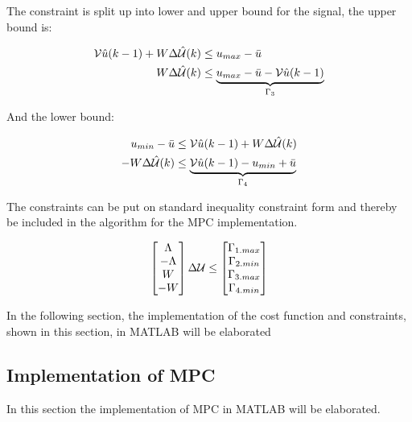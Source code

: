 The constraint is split up into lower and upper bound for the signal, the upper bound is:

 \begin{equation}
 \begin{aligned}
			 	\CMcal{V}\hat{u}(k-1)+W \Delta\hat{\CMcal{U}}(k)  &\leq  u_{max} -  \bar{u} \\
				W\Delta\hat{\CMcal{U}}(k)  &\leq  \underbrace{u_{max} -  \bar{u} - \CMcal{V}\hat{u}(k-1)}_{\Gamma_3} \\
 \end{aligned}
 \end{equation}



And the lower bound:

 \begin{equation}
 \begin{aligned}
			 	u_{min} -  \bar{u} &\leq \CMcal{V}\hat{u}(k-1)+W \Delta\hat{\CMcal{U}}(k) \\
-W\Delta\hat{\CMcal{U}}(k) &\leq \underbrace{\CMcal{V}\hat{u}(k-1)-u_{min}+\bar{u}}_{\Gamma_4}
 \end{aligned}
 \end{equation}

The constraints can be put on standard inequality constraint form and thereby be included in the algorithm for the MPC implementation.

 \begin{equation}
        \begin{bmatrix}
           \Lambda\\
           -\Lambda\\
           W \\
           -W
           \end{bmatrix}
           \Delta\CMcal{U}
           \leq 
           \begin{bmatrix}
         \Gamma_{1.max}\\
         \Gamma_{2.min}\\
         \Gamma_{3.max}\\
         \Gamma_{4.min}

           \end{bmatrix}
 \end{equation}\label{eq:constriants_eq}

 In the following section, the implementation of the cost function and constraints, shown in this section, in MATLAB will be elaborated

\subsection{Implementation of MPC}\label{subse:implementation_mpc}
In this section the implementation of MPC in MATLAB will be elaborated. 

